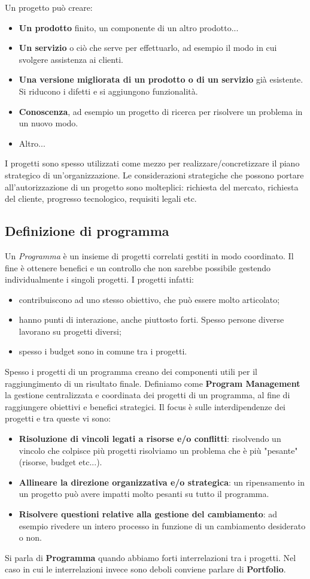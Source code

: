 Un progetto può creare:
\begin{itemize}
	\item \textbf{Un prodotto} finito, un componente di un altro prodotto...
	\item \textbf{Un servizio} o ciò che serve per effettuarlo, ad esempio il modo in cui svolgere assistenza ai clienti.
	\item \textbf{Una versione migliorata di un prodotto o di un servizio} già esistente. Si riducono i difetti e si aggiungono funzionalità.
	\item \textbf{Conoscenza}, ad esempio un progetto di ricerca per risolvere un problema in un nuovo modo.
	\item Altro...
\end{itemize}
I progetti sono spesso utilizzati come mezzo per realizzare/concretizzare il piano strategico di un'organizzazione. Le considerazioni strategiche che possono portare all'autorizzazione di un progetto sono molteplici: richiesta del mercato, richiesta del cliente, progresso tecnologico, requisiti legali etc.
\subsection{Definizione di programma}
Un \textit{Programma} è un insieme di progetti correlati gestiti in modo coordinato. Il fine è ottenere benefici e un controllo che non sarebbe possibile gestendo individualmente i singoli progetti.\newline
I progetti infatti:
\begin{itemize}
	\item contribuiscono ad uno stesso obiettivo, che può essere molto articolato;
	\item hanno punti di interazione, anche piuttosto forti. Spesso persone diverse lavorano su progetti diversi;
	\item spesso i budget sono in comune tra i progetti.
\end{itemize}
Spesso i progetti di un programma creano dei componenti utili per il raggiungimento di un risultato finale.\newline
Definiamo come \textbf{Program Management} la gestione centralizzata e coordinata dei progetti di un programma, al fine di raggiungere obiettivi e benefici strategici. Il focus è sulle interdipendenze dei progetti e tra queste vi sono:
\begin{itemize}
	\item \textbf{Risoluzione di vincoli legati a risorse e/o conflitti}: risolvendo un vincolo che colpisce più progetti risolviamo un problema che è più "pesante" (risorse, budget etc...).
	\item \textbf{Allineare la direzione organizzativa e/o strategica}: un ripensamento in un progetto può avere impatti molto pesanti su tutto il programma.
	\item \textbf{Risolvere questioni relative alla gestione del cambiamento}: ad esempio rivedere un intero processo in funzione di un cambiamento desiderato o non.
\end{itemize}
Si parla di \textbf{Programma} quando abbiamo forti interrelazioni tra i progetti. Nel caso in cui le interrelazioni invece sono deboli conviene parlare di \textbf{Portfolio}.
